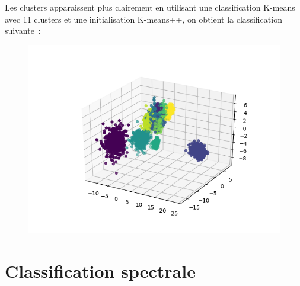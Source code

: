 \documentclass[12pt]{scrartcl} %
\begin{document}
Les clusters apparaissent plus clairement en utilisant une classification K-means avec 11 clusters et une initialisation K-means++, on obtient la classification suivante~:
\newline
\begin{figure}[!h]
 \centering 
\includegraphics[scale=.5]{kmeans_AFD8.png}
\end{figure}
\newline 
\section{Classification spectrale}
\end{document}
